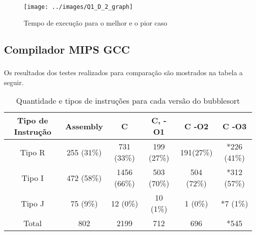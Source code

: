 \begin{itemize}
         \begin{figure}[H]
                 \centering
                 \texttt{[image: ../images/Q1\_D\_2\_graph]}
                \caption{Tempo de execução para o melhor e o pior caso}
                 \label{fig:graph_1D_2}
         \end{figure}
\end{itemize}

\subsection{Compilador MIPS GCC}

\subsubsection{}

\paragraph{}Os resultados dos testes realizados para comparação são mostrados 
na tabela a seguir.
\hspace{-2 cm}
\begin{table}[H]
	\centering 
	\begin{tabular}{|c|c|c|c|c|c|}\hline
Tipo de Instrução &Assembly &
 C & C, -O1& 
C -O2& C -O3 \\ \hline
Tipo R& 255 (31\%) &
731 (33\%)&
199 (27\%)&
191(27\%)&
*226 (41\%) \\ \hline
Tipo I &
472 (58\%)&
1456 (66\%)&
503 (70\%)&
504 (72\%)&
*312 (57\%) \\ \hline
Tipo J &
75 (9\%) &
12 (0\%)&
10 (1\%)&
1 (0\%)&
*7 (1\%)\\ \hline
Total &
802&
2199&
712&
696&
*545 \\ \hline
	\end{tabular}
	\caption{Quantidade e tipos de instruções para cada versão do bubblesort}
	\label{tab:A2_1}
\end{table}

